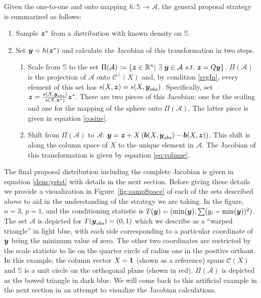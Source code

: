 \documentclass[12pt]{article}
\newcommand{\by}{\mbox{\boldmath $y$}}
\newcommand{\bz}{\mbox{\boldmath $z$}}
\newcommand{\bb}{\mbox{\boldmath $b$}}
\newcommand{\mc}{\mathcal}
\begin{document}
Given the one-to-one and onto mapping $h: \mathbb{S} \rightarrow \mathcal{A}$, the general proposal strategy is summarized as follows:
\begin{enumerate}
\item Sample $\bz^*$ from a distribution with known density on $\mathbb{S}$.
\item Set $\by = h(\bz^*)$ and calculate the Jacobian of this transformation in two steps.
\begin{enumerate}
\item Scale from $\mathbb{S}$ to the set $\Pi(\mathcal{A}):= \{\bz\in \mathbb{R}^n |\ \exists\ \by\in \mathcal{A}\ s.t.\ \bz=Q \by \}$. $\Pi(\mathcal{A})$ is the projection of $\mathcal{A}$ onto $\mathcal{C}^{\perp}(X)$ and, by condition \ref{regIn}, every element of this set has $s(X, \bz) = s(X, \by_{obs})$. Specifically, set $\bz=\frac{s(X,\boldsymbol{y}_{obs})}{s(X, \boldsymbol{z}^{*})}\bz^{*}$. There are two pieces of this Jacobian: one for the scaling and one for the mapping of the sphere onto $\Pi(\mathcal{A})$. The latter piece is given in equation \eqref{cosine}.
\item Shift  from $\Pi(\mathcal{A})$ to $\mathcal{A}$: $\by=\bz+X\left(\bb(X, \by_{obs})-\bb(X, \bz)\right)$. This shift is along the column space of $X$ to the unique element in $\mathcal{A}$. The Jacobian of this transformation is given by equation \eqref{eq:volume}.
\end{enumerate}
\end{enumerate}
The final proposal distribution including the complete Jacobian is given in equation \eqref{dens:ystst} with details in the next section. Before giving these details we provide a visualization  in Figure~\ref{fig:sampSpace} of each of the sets described above to aid in the understanding of the strategy we are taking. In the figure, $n = 3$, $p=1$, and the conditioning statistic is $T(\by)=(\min(\by), \sum (y_i - \min(\by))^2)$. The set $\mathcal{A}$ is depicted for $T(\by_{obs})=(0,1)$ which we describe as a ``warped triangle'' in light blue, with each side corresponding to a particular coordinate of $\by$ being the minimum value of zero. The other two coordinates are restricted by the scale statistic to lie on the quarter circle of radius one in the positive orthant. In this example, the column vector $X=\bf{1}$ (shown as a reference) spans $\mc{C}(X)$  and $\mathbb{S}$ is a unit circle on the orthogonal plane (shown in red). $\Pi(\mathcal{A})$ is depicted as the bowed triangle in dark blue. We will come back to this artificial example in the next section in an attempt to visualize the Jacobian calculations.
\end{document}

